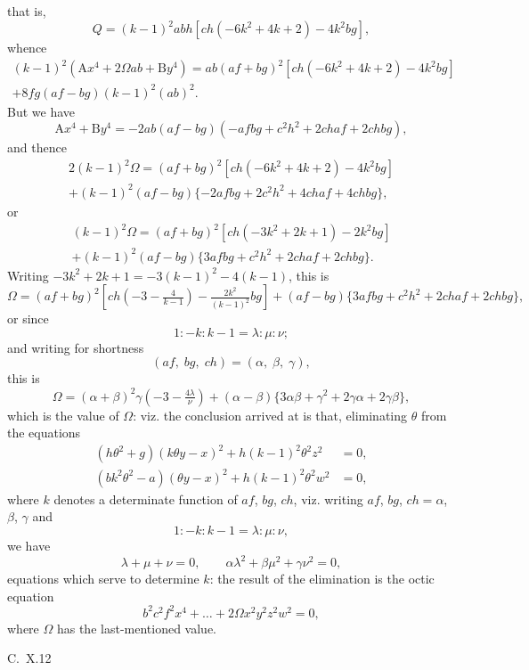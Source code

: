 \documentclass[11pt,a4paper]{book}
\begin{document}
\newpage
\setcounter{page}{109}

that is,
\[
Q = (k-1)^{2}abh[ch(-6k^{2} + 4k + 2) - 4k^{2}bg],
\]
whence
%
\begin{multline}
(k-1)^{2}(\text{A}x^{4} + 2\Omega ab + \text{B}y^{4}) = ab(af + bg)^{2}[ch(-6k^{2} + 4k + 2) - 4k^{2}bg] \\
+ 8fg(af - bg)(k-1)^{2}(ab)^{2}.
\end{multline}
%
But we have
\[
\text{A}x^{4} + \text{B}y^{4} = -2ab(af - bg)(-afbg + c^{2}h^{2} + 2chaf + 2chbg),
\]
and thence
%
\begin{multline}
2(k-1)^{2}\Omega = (af + bg)^{2}[ch(-6k^{2} + 4k + 2) - 4k^{2}bg] \\
+ (k-1)^{2}(af - bg)\{-2afbg + 2c^{2}h^{2} + 4chaf + 4chbg\},
\end{multline}
%
or
%
\begin{multline}
(k-1)^{2}\Omega = (af + bg)^{2}[ch(-3k^{2} + 2k + 1) - 2k^{2}bg] \\
+ (k-1)^{2}(af - bg)\{3afbg + c^{2}h^{2} + 2chaf + 2chbg\}.
\end{multline}
%
Writing $-3k^{2} + 2k + 1 = -3(k-1)^{2} - 4(k-1)$, this is
\[
\Omega = (af + bg)^{2}[ch(-3 - \tfrac{4}{k-1}) - \tfrac{2k^{2}}{(k-1)^{2}}bg] + (af - bg)\{3afbg + c^{2}h^{2} + 2chaf + 2chbg\},
\]
or since
\[
1 : -k : k-1 = \lambda : \mu : \nu;
\]
and writing for shortness
\[
(af,\; bg,\; ch) = (\alpha,\; \beta,\; \gamma),
\]
this is
\[
\Omega = (\alpha + \beta)^{2}\gamma(-3 - \tfrac{4\lambda}{\nu}) + (\alpha - \beta)\{3\alpha\beta + \gamma^{2} + 2\gamma\alpha + 2\gamma\beta\},
\]
which is the value of $\Omega$: viz. the conclusion arrived at is that, eliminating $\theta$ from the equations
\begin{align*}
(h\theta^{2} + g)(k\theta y - x)^{2} + h(k-1)^{2}\theta^{2}z^{2} &= 0, \\
(bk^{2}\theta^{2} - a)(\theta y - x)^{2} + h(k-1)^{2}\theta^{2}w^{2} &= 0,
\end{align*}
where $k$ denotes a determinate function of $af$, $bg$, $ch$, viz. writing $af$, $bg$, $ch = \alpha$, $\beta$, $\gamma$ and
\[
1 : -k : k-1 = \lambda : \mu : \nu,
\]
we have
\[
\lambda + \mu + \nu = 0, \qquad \alpha\lambda^{2} + \beta\mu^{2} + \gamma\nu^{2} = 0,
\]
equations which serve to determine $k$: the result of the elimination is the octic equation
\[
b^{2}c^{2}f^{2}x^{4} + \ldots + 2\Omega x^{2}y^{2}z^{2}w^{2} = 0,
\]
where $\Omega$ has the last-mentioned value.

\medskip\noindent\textsc{C.~X.}\hfill 12
\end{document}
